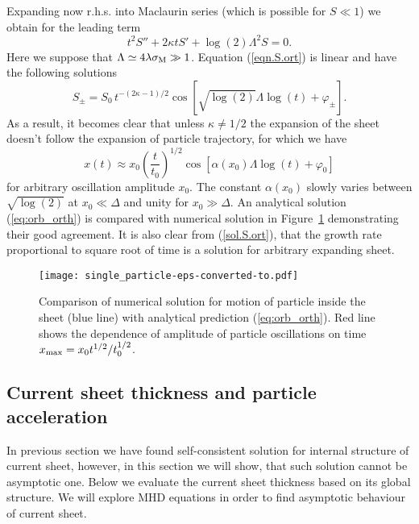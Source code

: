 \documentclass[useAMS,usenatbib]{mn2e}
\begin{document}
Expanding now r.h.s. into Maclaurin series (which is possible for $S \ll 1$) we obtain for the
leading term
\begin{equation}
\label{eqn.S.ort}
t^{2}S''+ 2\kappa t S' + \log (2) \Lambda^2S = 0.
\end{equation}
Here we suppose that $\Lambda \simeq 4\lambda\sigma_{\rm M} \gg 1$.
Equation (\ref{eqn.S.ort}) is linear and have the following solutions
\begin{equation}
\label{sol.S.ort}
S_{\pm} = S_0 \, t^{-(2\kappa-1)/2} 
\cos\left[\sqrt{\log (2)}\Lambda \log (t) + \varphi_{\pm}\right].
\end{equation}
As a result, it becomes clear that unless $\kappa\neq 1/2$ the expansion of the sheet 
doesn't follow the expansion of particle trajectory, for which we have
\begin{equation}
    x(t)\approx 
x_{0}\left(\frac{t}{t_0}\right)^{1/2}\cos\left[\alpha (x_0) \Lambda\log (t)
+\varphi_{0}\right]
\label{eq:orb_orth}
\end{equation}
for arbitrary oscillation amplitude $x_0$. The constant $\alpha(x_0)$ slowly varies
between $\sqrt{\log (2)}$ at $x_0 \ll \Delta$ and unity for \mbox{$x_0 \gg \Delta$.} 
An analytical solution (\ref{eq:orb_orth}) is compared with numerical solution in 
Figure~\ref{fig:orb_orth} demonstrating their good agreement. { It is also clear 
from (\ref{sol.S.ort}), that the growth rate proportional to square root of time is 
a solution for arbitrary expanding sheet.}

\begin{figure}
\centering
\texttt{[image: single\_particle-eps-converted-to.pdf]}
\caption{Comparison of numerical solution for motion of particle inside the
sheet (blue line) with analytical prediction (\ref{eq:orb_orth}). Red line 
shows the dependence of amplitude of particle oscillations on time
$x_{\rm max} = x_0 t^{1/2}/t_0^{1/2}$.}
\label{fig:orb_orth}
\end{figure}

\subsection{Current sheet thickness and particle acceleration}
\label{sect.Est}

In previous section we have found self-consistent solution for internal 
structure of current sheet, however, in this section we will show, that 
such solution cannot be asymptotic one. Below we evaluate the current 
sheet thickness based on its global structure. We will explore MHD equations 
in order to find asymptotic behaviour of current sheet.
\end{document}
